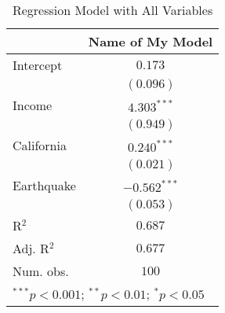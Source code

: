 
\begin{table}
\begin{center}
\begin{footnotesize}
\begin{tabular}{l c}
\hline
 & Name of My Model \\
\hline
Intercept  & $0.173$        \\
           & $(0.096)$      \\
Income     & $4.303^{***}$  \\
           & $(0.949)$      \\
California & $0.240^{***}$  \\
           & $(0.021)$      \\
Earthquake & $-0.562^{***}$ \\
           & $(0.053)$      \\
\hline
R$^2$      & $0.687$        \\
Adj. R$^2$ & $0.677$        \\
Num. obs.  & $100$          \\
\hline
\multicolumn{2}{l}{\tiny{$^{***}p<0.001$; $^{**}p<0.01$; $^{*}p<0.05$}}
\end{tabular}
\end{footnotesize}
\caption{Regression Model with All Variables}
\label{tab:lm_full_model}
\end{center}
\end{table}
